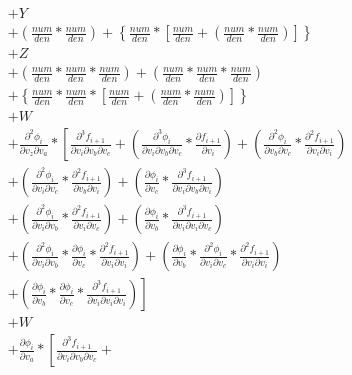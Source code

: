 \documentclass[12pt,letter]{article}
\begin{document}
\begin{equation}
\begin{split}
	\\
	&+
	Y
	\\
	&+
	\left(\frac{num}{den} * \frac{num}{den}\right) + \left\{\frac{num}{den} * \left[\frac{num}{den} + \left(\frac{num}{den} * \frac{num}{den}\right)\right]\right\}
	\\
	&+
	Z
	\\
	&+
	\left(\frac{num}{den} * \frac{num}{den} * \frac{num}{den}\right) + \left(\frac{num}{den} * \frac{num}{den} * \frac{num}{den}\right)
	\\
	&+
	\left\{\frac{num}{den} * \frac{num}{den} * \left[\frac{num}{den} + \left(\frac{num}{den} * \frac{num}{den}\right)\right]\right\}
	\\
	&+
	W
	\\
	&+
	\frac{\partial^2 \phi_i}{\partial v_z \partial v_a} * 
	\left[\frac{\partial^3 f_{i+1}}{\partial v_i \partial v_b \partial v_c} + 
	\left(\frac{\partial^3 \phi_i}{\partial v_i \partial v_b \partial v_c} * \frac{\partial f_{i+1}}{\partial v_i}\right) + 
	\left(\frac{\partial^2 \phi_i}{\partial v_b \partial v_c} * \frac{\partial^2 f_{i+1}}{\partial v_i \partial v_i}\right) 
	\right.
	\\
	&
	\left.
	+ \left(\frac{\partial^2 \phi_i}{\partial v_i \partial v_c} * \frac{\partial^2 f_{i+1}}{\partial v_b \partial v_i}\right) + 
	\left(\frac{\partial \phi_i}{\partial v_c} * \frac{\partial^3 f_{i+1}}{\partial v_i \partial v_b \partial v_i}\right) 
	\right.
	\\
	&
	\left.
	+ \left(\frac{\partial^2 \phi_i}{\partial v_i \partial v_b} * \frac{\partial^2 f_{i+1}}{\partial v_i \partial v_c}\right) + 
	\left(\frac{\partial \phi_i}{\partial v_b} * \frac{\partial^3 f_{i+1}}{\partial v_i \partial v_i \partial v_c}\right) 
	\right.
	\\
	&
	\left.
	+ \left(\frac{\partial^2 \phi_i}{\partial v_i \partial v_b} * \frac{\partial \phi_i}{\partial v_c} * \frac{\partial^2 f_{i+1}}{\partial v_i \partial v_i}\right) + 
	\left(\frac{\partial \phi_i}{\partial v_b} * \frac{\partial^2 \phi_i}{\partial v_i \partial v_c} * \frac{\partial^2 f_{i+1}}{\partial v_i \partial v_i}\right) 
	\right.
	\\
	&
	\left.
	+ \left(\frac{\partial \phi_i}{\partial v_b} * \frac{\partial \phi_i}{\partial v_c} * \frac{\partial^3 f_{i+1}}{\partial v_i \partial v_i \partial v_i}\right)\right]
	\\
	&+
	W
	\\
	&+
	\frac{\partial \phi_i}{\partial v_a} * 
	\left[\frac{\partial^3 f_{i+1}}{\partial v_i \partial v_b \partial v_c} + 

\end{split}
\end{equation}
\end{document}
